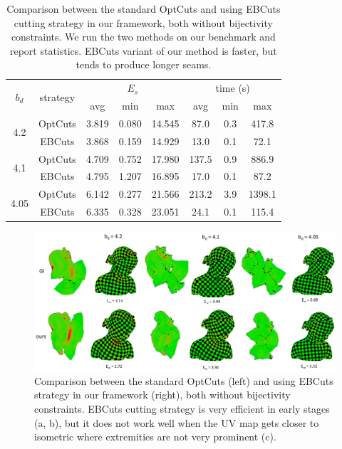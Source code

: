 \begin{table}[t]
\centering
\caption{Comparison between the standard OptCuts and using EBCuts cutting strategy in our framework, both without bijectivity constraints. We run the two methods on our benchmark and report statistics. EBCuts variant of our method is faster, but tends to produce longer seams.} 
\label{tb:comp_GI}
\begin{tabular}{|c|c|ccc|ccc|}
\hline
\multirow{2}{*}{$b_d$} & \multirow{2}{*}{strategy} & \multicolumn{3}{c|}{$E_{s}$} & \multicolumn{3}{c|}{time (s)} \\ \cline{3-8} 
                       &                         & avg      & min     & max      & avg       & min    & max      \\ \hline
\multirow{2}{*}{4.2}   & OptCuts                    & 3.819   & 0.080  & 14.545  & 87.0   & 0.3 & 417.8 \\
                       & EBCuts                & 3.868   & 0.159  & 14.929  & 13.0   & 0.1 & 72.1  \\ \hline
\multirow{2}{*}{4.1}   & OptCuts                    & 4.709   & 0.752  & 17.980  & 137.5  & 0.9 & 886.9 \\
                       & EBCuts                & 4.795   & 1.207  & 16.895  & 17.0   & 0.1 & 87.2  \\ \hline
\multirow{2}{*}{4.05}  & OptCuts                    & 6.142   & 0.277  & 21.566  & 213.2  & 3.9 & 1398.1   \\
                       & EBCuts                & 6.335   & 0.328  & 23.051  & 24.1   & 0.1 & 115.4 \\ \hline
\end{tabular}
\end{table}

\begin{figure}[t]
\centering
\includegraphics[width=0.8\linewidth]{fig/comp_GI.png}
\caption{Comparison between the standard OptCuts (left) and using EBCuts strategy in our framework (right), both without bijectivity constraints. EBCuts cutting strategy is very efficient in early stages (a, b), but it does not work well when the UV map gets closer to isometric where extremities are not very prominent (c).}
\label{fig:comp_GI}
\end{figure}

